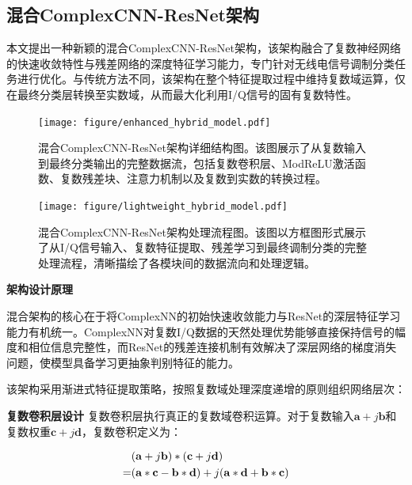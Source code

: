 \documentclass[conference]{IEEEtran}
\begin{document}
\subsection{混合ComplexCNN-ResNet架构}

本文提出一种新颖的混合ComplexCNN-ResNet架构，该架构融合了复数神经网络的快速收敛特性与残差网络的深度特征学习能力，专门针对无线电信号调制分类任务进行优化。与传统方法不同，该架构在整个特征提取过程中维持复数域运算，仅在最终分类层转换至实数域，从而最大化利用I/Q信号的固有复数特性。

\begin{figure}[htbp]
\centering
\texttt{[image: figure/enhanced\_hybrid\_model.pdf]}
\caption{混合ComplexCNN-ResNet架构详细结构图。该图展示了从复数输入到最终分类输出的完整数据流，包括复数卷积层、ModReLU激活函数、复数残差块、注意力机制以及复数到实数的转换过程。}
\label{fig:enhanced_hybrid_model}
\end{figure}


\begin{figure}[htbp]
\centering
\texttt{[image: figure/lightweight\_hybrid\_model.pdf]}
\caption{混合ComplexCNN-ResNet架构处理流程图。该图以方框图形式展示了从I/Q信号输入、复数特征提取、残差学习到最终调制分类的完整处理流程，清晰描绘了各模块间的数据流向和处理逻辑。}
\label{fig:lightweight_hybrid_model_flow}
\end{figure}

\textbf{架构设计原理}

混合架构的核心在于将ComplexNN的初始快速收敛能力与ResNet的深层特征学习能力有机统一。ComplexNN对复数I/Q数据的天然处理优势能够直接保持信号的幅度和相位信息完整性，而ResNet的残差连接机制有效解决了深层网络的梯度消失问题，使模型具备学习更抽象判别特征的能力。

该架构采用渐进式特征提取策略，按照复数域处理深度递增的原则组织网络层次：

\textbf{复数卷积层设计} 复数卷积层执行真正的复数域卷积运算。对于复数输入$\mathbf{a} + j\mathbf{b}$和复数权重$\mathbf{c} + j\mathbf{d}$，复数卷积定义为：


\begin{align}
&(\mathbf{a} + j\mathbf{b}) * (\mathbf{c} + j\mathbf{d}) \notag \\
= &(\mathbf{a} * \mathbf{c} - \mathbf{b} * \mathbf{d}) 
+ j(\mathbf{a} * \mathbf{d} + \mathbf{b} * \mathbf{c})
\end{align}
\end{document}
